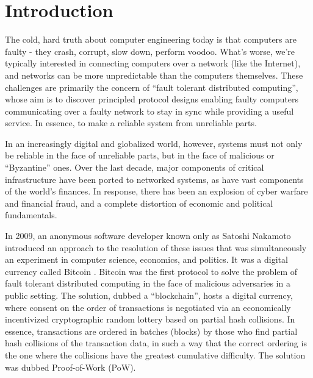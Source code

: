 \chapter{Introduction}
\label{ch:intro}

The cold, hard truth about computer engineering today is that computers are faulty - 
they crash, corrupt, slow down, perform voodoo. 
What's worse, we're typically interested in connecting computers over a network (like the Internet),
and networks can be more unpredictable than the computers themselves.
These challenges are primarily the concern of ``fault tolerant distributed computing'',
whose aim is to discover principled protocol designs enabling faulty computers communicating over a faulty network 
to stay in sync while providing a useful service.
In essence, to make a reliable system from unreliable parts.

In an increasingly digital and globalized world, however, 
systems must not only be reliable in the face of unreliable parts, but in the face of malicious or ``Byzantine'' ones.
Over the last decade, major components of critical infrastructure have been ported to networked systems,
as have vast components of the world's finances.
In response, there has been an explosion of cyber warfare and financial fraud,
and a complete distortion of economic and political fundamentals.

In 2009, an anonymous software developer known only as Satoshi Nakamoto introduced an approach to the resolution of these issues 
that was simultaneously an experiment in computer science, economics, and politics. 
It was a digital currency called Bitcoin \cite{bitcoin}.
Bitcoin was the first protocol to solve the problem of fault tolerant distributed computing in the face of malicious adversaries in a public setting.
The solution, dubbed a ``blockchain'', hosts a digital currency, 
where consent on the order of transactions is negotiated via an economically incentivized cryptographic random lottery based on partial hash collisions.
In essence, transactions are ordered in batches (blocks) by those who find partial hash collisions of the transaction data, 
in such a way that the correct ordering is the one where the collisions have the greatest cumulative difficulty.
The solution was dubbed Proof-of-Work (PoW).

